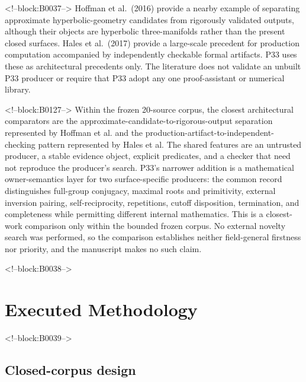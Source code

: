 \documentclass[11pt,a4paper]{article}
\begin{document}
<!--block:B0037-->
Hoffman et al.~(2016)
\citep{P33-S19}
 provide a nearby example of separating approximate hyperbolic-geometry candidates from rigorously validated outputs, although their objects are hyperbolic three-manifolds rather than the present closed surfaces. Hales et al.~(2017)
\citep{P33-S20}
 provide a large-scale precedent for production computation accompanied by independently checkable formal artifacts. P33 uses these as architectural precedents only. The literature does not validate an unbuilt P33 producer or require that P33 adopt any one proof-assistant or numerical library.

<!--block:B0127-->
Within the frozen 20-source corpus, the closest architectural comparators are the approximate-candidate-to-rigorous-output separation represented by Hoffman et al. and the production-artifact-to-independent-checking pattern represented by Hales et al. The shared features are an untrusted producer, a stable evidence object, explicit predicates, and a checker that need not reproduce the producer's search. P33's narrower addition is a mathematical owner-semantics layer for two surface-specific producers: the common record distinguishes full-group conjugacy, maximal roots and primitivity, external inversion pairing, self-reciprocity, repetitions, cutoff disposition, termination, and completeness while permitting different internal mathematics. This is a closest-work comparison only within the bounded frozen corpus. No external novelty search was performed, so the comparison establishes neither field-general firstness nor priority, and the manuscript makes no such claim.

<!--block:B0038-->
\hypertarget{executed-methodology}{%
\section{Executed Methodology}\label{executed-methodology}}

<!--block:B0039-->
\hypertarget{closed-corpus-design}{%
\subsection{Closed-corpus design}\label{closed-corpus-design}}
\end{document}
